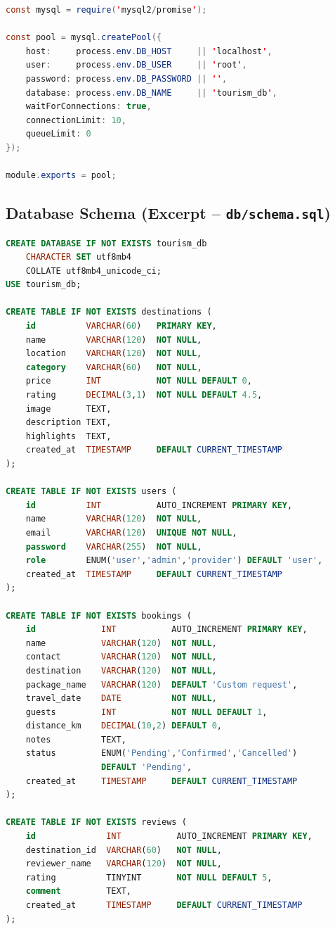 \begin{lstlisting}[language=Java, caption={connection.js -- MySQL Connection Pool}]
const mysql = require('mysql2/promise');

const pool = mysql.createPool({
    host:     process.env.DB_HOST     || 'localhost',
    user:     process.env.DB_USER     || 'root',
    password: process.env.DB_PASSWORD || '',
    database: process.env.DB_NAME     || 'tourism_db',
    waitForConnections: true,
    connectionLimit: 10,
    queueLimit: 0
});

module.exports = pool;
\end{lstlisting}

\subsection*{Database Schema (Excerpt -- \texttt{db/schema.sql})}

\begin{lstlisting}[language=SQL, caption={schema.sql -- Core Table Definitions}]
CREATE DATABASE IF NOT EXISTS tourism_db
    CHARACTER SET utf8mb4
    COLLATE utf8mb4_unicode_ci;
USE tourism_db;

CREATE TABLE IF NOT EXISTS destinations (
    id          VARCHAR(60)   PRIMARY KEY,
    name        VARCHAR(120)  NOT NULL,
    location    VARCHAR(120)  NOT NULL,
    category    VARCHAR(60)   NOT NULL,
    price       INT           NOT NULL DEFAULT 0,
    rating      DECIMAL(3,1)  NOT NULL DEFAULT 4.5,
    image       TEXT,
    description TEXT,
    highlights  TEXT,
    created_at  TIMESTAMP     DEFAULT CURRENT_TIMESTAMP
);

CREATE TABLE IF NOT EXISTS users (
    id          INT           AUTO_INCREMENT PRIMARY KEY,
    name        VARCHAR(120)  NOT NULL,
    email       VARCHAR(120)  UNIQUE NOT NULL,
    password    VARCHAR(255)  NOT NULL,
    role        ENUM('user','admin','provider') DEFAULT 'user',
    created_at  TIMESTAMP     DEFAULT CURRENT_TIMESTAMP
);

CREATE TABLE IF NOT EXISTS bookings (
    id             INT           AUTO_INCREMENT PRIMARY KEY,
    name           VARCHAR(120)  NOT NULL,
    contact        VARCHAR(120)  NOT NULL,
    destination    VARCHAR(120)  NOT NULL,
    package_name   VARCHAR(120)  DEFAULT 'Custom request',
    travel_date    DATE          NOT NULL,
    guests         INT           NOT NULL DEFAULT 1,
    distance_km    DECIMAL(10,2) DEFAULT 0,
    notes          TEXT,
    status         ENUM('Pending','Confirmed','Cancelled')
                   DEFAULT 'Pending',
    created_at     TIMESTAMP     DEFAULT CURRENT_TIMESTAMP
);

CREATE TABLE IF NOT EXISTS reviews (
    id              INT           AUTO_INCREMENT PRIMARY KEY,
    destination_id  VARCHAR(60)   NOT NULL,
    reviewer_name   VARCHAR(120)  NOT NULL,
    rating          TINYINT       NOT NULL DEFAULT 5,
    comment         TEXT,
    created_at      TIMESTAMP     DEFAULT CURRENT_TIMESTAMP
);
\end{lstlisting}

